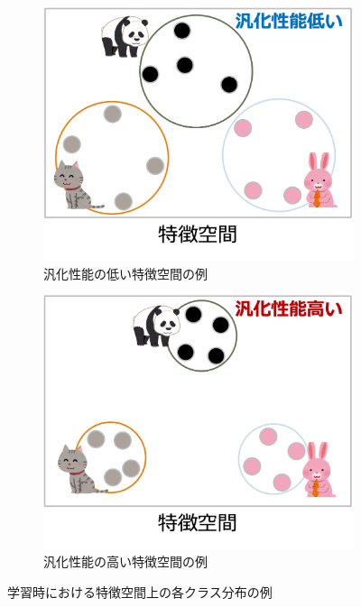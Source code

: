 \begin{figure}[tbp]
  \centering
  \begin{subfigure}[b]{0.45\linewidth}
    \centering
    \includegraphics[height=0.9\linewidth, keepaspectratio]{image/bad_featurespace.png}
    \caption{汎化性能の低い特徴空間の例}
    \label{fig:bad_featurespace}
  \end{subfigure}
  \hfill
  \begin{subfigure}[b]{0.45\linewidth}
    \centering
    \includegraphics[height=0.9\linewidth, keepaspectratio]{image/good_featurespace.png}
    \caption{汎化性能の高い特徴空間の例}
    \label{fig:good_featurespace}
  \end{subfigure}
  \caption{学習時における特徴空間上の各クラス分布の例}
  \label{fig:feature_space}
\end{figure}
